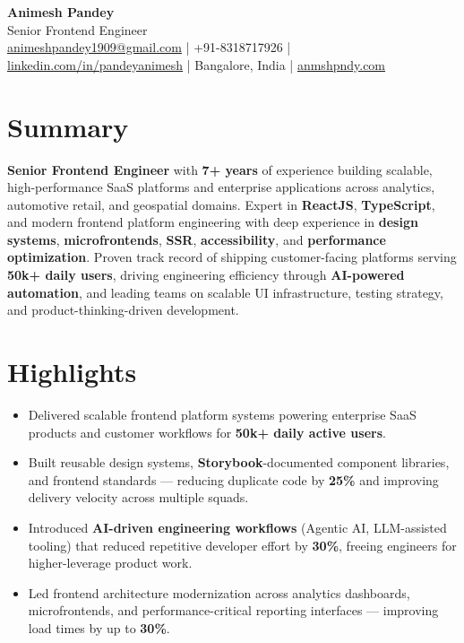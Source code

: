 \documentclass[a4paper,10pt]{article}
\begin{document}
{\Huge \textbf{Animesh Pandey}}\\[2pt]
{\large Senior Frontend Engineer}\\[4pt]

\sloppy
\href{mailto:animeshpandey1909@gmail.com}{animeshpandey1909@gmail.com} \quad | \quad
+91-8318717926 \quad | \quad
\href{https://linkedin.com/in/pandeyanimesh}{linkedin.com/in/pandeyanimesh} \quad | \quad
Bangalore, India \quad | \quad
\href{https://anmshpndy.com}{anmshpndy.com}

\section*{Summary}
\textbf{Senior Frontend Engineer} with \textbf{7+ years} of experience building scalable, high-performance SaaS platforms and enterprise applications across analytics, automotive retail, and geospatial domains.
Expert in \textbf{ReactJS}, \textbf{TypeScript}, and modern frontend platform engineering with deep experience in \textbf{design systems}, \textbf{microfrontends}, \textbf{SSR}, \textbf{accessibility}, and \textbf{performance optimization}.
Proven track record of shipping customer-facing platforms serving \textbf{50k+ daily users}, driving engineering efficiency through \textbf{AI-powered automation}, and leading teams on scalable UI infrastructure, testing strategy, and product-thinking-driven development.

\section*{Highlights}
\begin{itemize}
  \item Delivered scalable frontend platform systems powering enterprise SaaS products and customer workflows for \textbf{50k+ daily active users}.
  \item Built reusable design systems, \textbf{Storybook}-documented component libraries, and frontend standards — reducing duplicate code by \textbf{25\%} and improving delivery velocity across multiple squads.
  \item Introduced \textbf{AI-driven engineering workflows} (Agentic AI, LLM-assisted tooling) that reduced repetitive developer effort by \textbf{30\%}, freeing engineers for higher-leverage product work.
  \item Led frontend architecture modernization across analytics dashboards, microfrontends, and performance-critical reporting interfaces — improving load times by up to \textbf{30\%}.
\end{itemize}
\end{document}
